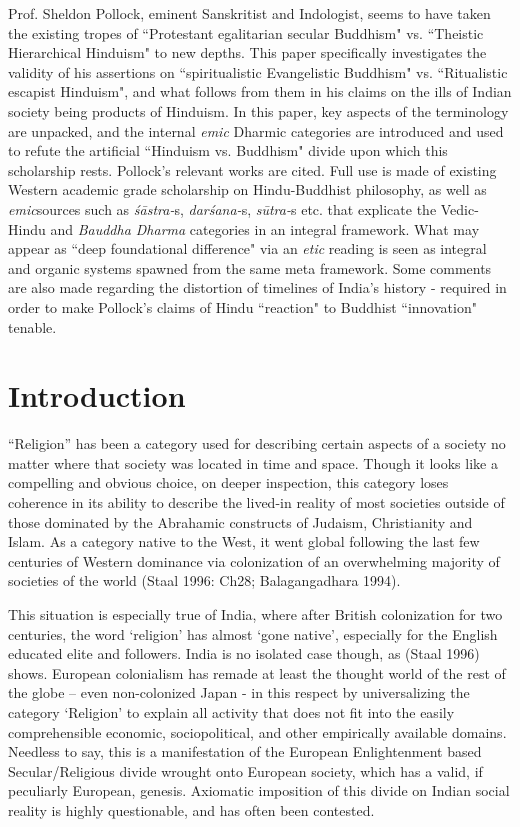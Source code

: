 Prof. Sheldon Pollock, eminent Sanskritist and Indologist, seems to have taken the existing tropes of ``Protestant egalitarian secular Buddhism" vs. ``Theistic Hierarchical Hinduism" to new depths. This paper specifically investigates the validity of his assertions on ``spiritualistic Evangelistic Buddhism" vs. ``Ritualistic escapist Hinduism", and what follows from them in his claims on the ills of Indian society being products of Hinduism. In this paper, key aspects of the terminology are unpacked, and the internal \textit{emic} Dharmic categories are introduced and used to refute the artificial ``Hinduism vs. Buddhism" divide upon which this scholarship rests. Pollock's relevant works are cited. Full use is made of existing Western academic grade scholarship on Hindu-Buddhist philosophy, as well as \textit{emic}sources such as \textit{śāstra-}s, \textit{darśana-}s, \textit{sūtra-}s etc. that explicate the Vedic-Hindu and \textit{Bauddha Dharma} categories in an integral framework. What may appear as ``deep foundational difference" via an \textit{etic} reading is seen as integral and organic systems spawned from the same meta framework. Some comments are also made regarding the distortion of timelines of India's history - required in order to make Pollock's claims of Hindu ``reaction" to Buddhist ``innovation" tenable.


\section*{Introduction}

“Religion” has been a category used for describing certain aspects of a society no matter where that society was located in time and space. Though it looks like a compelling and obvious choice, on deeper inspection, this category loses coherence in its ability to describe the lived-in reality of most societies outside of those dominated by the Abrahamic constructs of Judaism, Christianity and Islam. As a category native to the West, it went global following the last few centuries of Western dominance via colonization of an overwhelming majority of societies of the world (Staal 1996: Ch28; Balagangadhara 1994).

This situation is especially true of India, where after British colonization for two centuries, the word ‘religion’ has almost ‘gone native’, especially for the English educated elite and followers. India is no isolated case though, as (Staal 1996) shows. European colonialism has remade at least the thought world of the rest of the globe – even non-colonized Japan - in this respect by universalizing the category ‘Religion’ to explain all activity that does not fit into the easily comprehensible economic, sociopolitical, and other empirically available domains. Needless to say, this is a manifestation of the European Enlightenment based Secular/Religious divide wrought onto European society, which has a valid, if peculiarly European, genesis. Axiomatic imposition of this divide on Indian social reality is highly questionable, and has often been contested.

